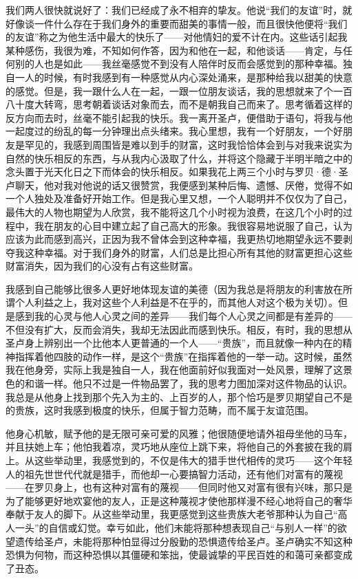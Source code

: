 \par 我们两人很快就说好了：我们已经成了永不相弃的挚友。他说“我们的友谊”时，就好像谈一件什么存在于我们身外的重要而甜美的事情一般，而且很快他便将“我们的友谊”称之为他生活中最大的快乐了——对他情妇的爱不计在内。这些话引起我某种感伤，我很为难，不知如何作答，因为和他在一起，和他谈话——肯定，与任何别的人也是如此——我丝毫感觉不到没有人陪伴时反而会感觉到的那种幸福。独自一人的时候，有时我感到有一种感觉从内心深处涌来，是那种给我以甜美的快意的感觉。但是，我一跟什么人在一起，一跟一位朋友谈话，我的思想就来了个一百八十度大转弯，思考朝着谈话对象而去，而不是朝我自己而来了。思考循着这样的反方向而去时，丝毫不能引起我的快乐。我一离开圣卢，便借助于语句，将我与他一起度过的纷乱的每一分钟理出点头绪来。我心里想，我有一个好朋友，一个好朋友是罕见的，我感到周围皆是难以到手的财富，这时我恰恰体会到与对我来说实为自然的快乐相反的东西，与从我内心汲取了什么，并将这个隐藏于半明半暗之中的念头置于光天化日之下而体会的快乐相反。如果我花上两三个小时与罗贝·德·圣卢聊天，他对我对他说的话又很赞赏，我便感到某种后悔、遗憾、厌倦，觉得不如一个人独处及准备好开始工作。但是我心里又想，一个人聪明并不仅仅为了自己，最伟大的人物也期望为人欣赏，我不能将这几个小时视为浪费，在这几个小时的过程中，我在朋友的心目中建立起了自己高大的形象。我很容易地说服了自己，认为应该为此而感到高兴，正因为我不曾体会到这种幸福，我更热切地期望永远不要剥夺我这种幸福。对于我们身外的财富，人们总是比担心所有其他的财富更担心这些财富消失，因为我们的心没有占有这些财富。
\par 我感到自己能够比很多人更好地体现友谊的美德（因为我总是将朋友的利害放在所谓个人利益之上，我对这些个人利益是不在乎的，而其他人对这个极为关切）。但是感到我的心灵与他人心灵之间的差异——我们每个人心灵之间都是有差异的——不但没有扩大，反而会消失，我却无法因此而感到快乐。相反，有时，我的思想从圣卢身上辨别出一个比他本人更普通的一个人——“贵族”，而且就像一种内在的精神指挥着他四肢的动作一样，是这个“贵族”在指挥着他的一举一动。这时候，虽然我在他身旁，实际上我是独自一人，我在他面前好似我面对一处风景，理解了这景色的和谐一样。他只不过是一件物品罢了，我的思考力图加深对这件物品的认识。我总是从他身上找到那个先入为主的、上百岁的人，那个恰巧是罗贝期望自己不是的贵族，这时我感到极度的快乐，但属于智力范畴，而不属于友谊范围。
\par 他身心机敏，赋予他的是无限可亲可爱的风雅；他很随便地请外祖母坐他的马车，并且扶她上车；他怕我着凉，灵巧地从座位上跳下来，将他自己的外套披在我的肩上。从这些举动里，我感觉到的，不仅是伟大的猎手世代相传的灵巧——这个年轻人的祖先世世代代就是猎手，而他却一心要搞智力活动，还有他们对富有的蔑视——在罗贝身上，也有这种对富有的蔑视——但同时他又对富有很有兴味，那只是为了能够更好地欢宴他的友人，正是这种蔑视才使他那样漫不经心地将自己的奢华奉献于友人的脚下。从这些举动里，我更感觉到这些贵族大老爷那种认为自己“高人一头”的自信或幻觉。幸亏如此，他们未能将那种想表现自己“与别人一样”的欲望遗传给圣卢，未能将那种怕显得过分殷勤的恐惧遗传给圣卢。圣卢确实不知这种恐惧为何物，而这种恐惧以其僵硬和笨拙，使最诚挚的平民百姓的和蔼可亲都变成了丑态。
